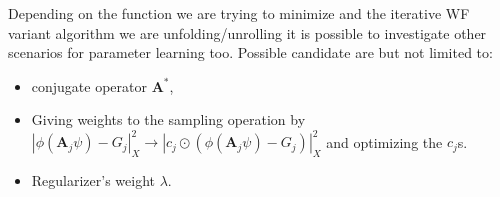Depending on the function we are trying to minimize and the iterative \ac{WF} variant algorithm we are unfolding/unrolling 
it is possible to investigate other scenarios for parameter learning too. Possible candidate are but not limited to:

\begin{itemize}
  \item conjugate operator $\boldsymbol{A}^*$,
  \item Giving weights to the sampling operation by $\left|\phi(\boldsymbol{A}_j\psi)-G_j\right|_X^2 \rightarrow \left|c_j \odot \left(\phi(\boldsymbol{A}_j\psi)-G_j\right)\right|_X^2$ and optimizing the $c_j$s.
  \item Regularizer's weight $\lambda$.
\end{itemize}









